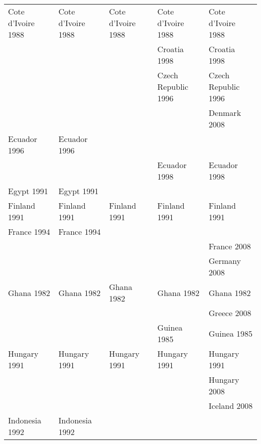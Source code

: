 \begin{table}[ht]
{\begin{tabular}{lllll}
  Cote d'Ivoire 1988\cellcolor[gray]{0.916666666666667} & Cote d'Ivoire 1988\cellcolor[gray]{0.916666666666667} & Cote d'Ivoire 1988\cellcolor[gray]{0.916666666666667} & Cote d'Ivoire 1988\cellcolor[gray]{0.916666666666667} & Cote d'Ivoire 1988\cellcolor[gray]{0.916666666666667} \\ 
   &  &  & Croatia 1998\cellcolor[gray]{0.5} & Croatia 1998\cellcolor[gray]{0.5} \\ 
   &  &  & Czech Republic 1996\cellcolor[gray]{0.5} & Czech Republic 1996\cellcolor[gray]{0.5} \\ 
   &  &  &  & Denmark 2008\cellcolor[gray]{0.5} \\ 
  Ecuador 1996\cellcolor[gray]{0.5} & Ecuador 1996\cellcolor[gray]{0.5} &  &  &  \\ 
   &  &  & Ecuador 1998\cellcolor[gray]{0.5} & Ecuador 1998\cellcolor[gray]{0.5} \\ 
  Egypt 1991\cellcolor[gray]{0.5} & Egypt 1991\cellcolor[gray]{0.5} &  &  &  \\ 
  Finland 1991\cellcolor[gray]{0.5} & Finland 1991\cellcolor[gray]{0.5} & Finland 1991\cellcolor[gray]{0.5} & Finland 1991\cellcolor[gray]{0.5} & Finland 1991\cellcolor[gray]{0.5} \\ 
  France 1994\cellcolor[gray]{0.5} & France 1994\cellcolor[gray]{0.5} &  &  &  \\ 
   &  &  &  & France 2008\cellcolor[gray]{0.5} \\ 
   &  &  &  & Germany 2008\cellcolor[gray]{0.5} \\ 
  Ghana 1982\cellcolor[gray]{0.833333333333333} & Ghana 1982\cellcolor[gray]{0.833333333333333} & Ghana 1982\cellcolor[gray]{0.833333333333333} & Ghana 1982\cellcolor[gray]{0.833333333333333} & Ghana 1982\cellcolor[gray]{0.833333333333333} \\ 
   &  &  &  & Greece 2008\cellcolor[gray]{0.5} \\ 
   &  &  & Guinea 1985\cellcolor[gray]{1} & Guinea 1985\cellcolor[gray]{1} \\ 
  Hungary 1991\cellcolor[gray]{0.75} & Hungary 1991\cellcolor[gray]{0.75} & Hungary 1991\cellcolor[gray]{0.75} & Hungary 1991\cellcolor[gray]{0.75} & Hungary 1991\cellcolor[gray]{0.75} \\ 
   &  &  &  & Hungary 2008\cellcolor[gray]{0.5} \\ 
   &  &  &  & Iceland 2008\cellcolor[gray]{0.5} \\ 
  Indonesia 1992\cellcolor[gray]{1} & Indonesia 1992\cellcolor[gray]{1} &  &  &  \\ 

\end{tabular}}
\end{table}
